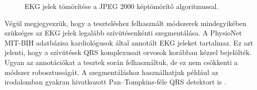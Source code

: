 \documentclass[oneside,titlepage,12pt,a4paper]{report}
\begin{document}
\begin{figure}[htb!]
\caption{EKG jelek tömörítése a JPEG 2000 képtömörítő algoritmussal.}
\label{fig:jpegECG}
\end{figure}	
Végül megjegyezzük, hogy a teszteléshez felhasznált módszerek mindegyikében szükséges az EKG jelek legalább szívütésenkénti szegmentálása. A PhysioNet MIT-BIH adatbázisa kardiológusok által annotált EKG jeleket tartalmaz. Ez azt jelenti, hogy a szívütések QRS komplexusait orvosok korábban kézzel bejelölték. Ugyan az annotációkat a tesztek során felhasználtuk, de ez nem csökkenti a módszer robosztusságát. A szegmentáláshoz használhatjuk például az irodalomban gyakran hivatkozott Pan--Tompkins-féle QRS detektort is \cite{tompkins}.
\end{document}

